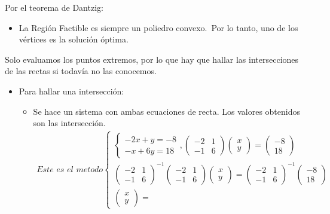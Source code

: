 \documentclass[12pt, twoside, openright]{report} %
\begin{document}
	  Por el teorema de Dantzig:

      \begin{itemize}
    
      \item
        La Región Factible es siempre un poliedro convexo.~Por lo tanto,
        uno de los vértices es la solución óptima.
      \end{itemize}

	  Solo evaluamos los puntos extremos, por lo que hay que hallar las
      intersecciones de las rectas si todavía no las conocemos.
	  \begin{itemize}
		  \item Para hallar una intersección: 
		  \begin{itemize}
			  \item Se hace un sistema con ambas
			  ecuaciones de recta. Los valores obtenidos son las intersección.
			  \begin{eqnarray*}
				\textit{Este es el metodo}\left\{\begin{matrix}
					\left\{\begin{matrix}
					-2x+y=-8\\ 
					-x+6y=18
					\end{matrix}\right.
					,
					\begin{pmatrix}
					-2 & 1 \\ 
					-1 & 6
					\end{pmatrix}
					\begin{pmatrix}
					x \\ 
					y
					\end{pmatrix}
					=
					\begin{pmatrix}
					-8 \\ 
					18
					\end{pmatrix}\\ 
					\begin{pmatrix}
					-2 & 1 \\ 
					-1 & 6
					\end{pmatrix}^{-1}
					\begin{pmatrix}
					-2 & 1 \\ 
					-1 & 6
					\end{pmatrix}
					\begin{pmatrix}
					x \\ 
					y
					\end{pmatrix}
					=
					\begin{pmatrix}
					-2 & 1 \\ 
					-1 & 6
					\end{pmatrix}^{-1}
					\begin{pmatrix}
					-8 \\ 
					18
					\end{pmatrix}\\ 
					\begin{pmatrix}
					x \\ 
					y
					\end{pmatrix}
					=
					

\end{matrix}
\end{eqnarray*}
\end{itemize}
\end{itemize}
\end{document}
